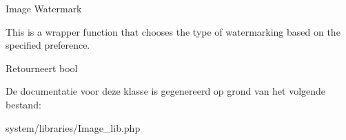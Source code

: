 Image Watermark

This is a wrapper function that chooses the type of watermarking based on the specified preference.

\begin{DoxyReturn}{Retourneert}
bool 
\end{DoxyReturn}


De documentatie voor deze klasse is gegenereerd op grond van het volgende bestand\+:\begin{DoxyCompactItemize}
\item 
system/libraries/Image\+\_\+lib.\+php\end{DoxyCompactItemize}
